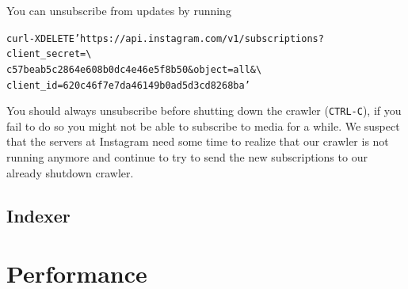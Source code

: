 \documentclass[11pt]{article}
\begin{document}
		You can unsubscribe from updates by running
		\begin{alltt}
			curl -X DELETE 'https://api.instagram.com/v1/subscriptions?client_secret=\textbackslash
			     c57beab5c2864e608b0dc4e46e5f8b50&object=all&\textbackslash
			     client_id=620c46f7e7da46149b0ad5d3cd8268ba'
		\end{alltt}

		You should always unsubscribe before shutting down the crawler (\texttt{CTRL-C}), if you fail to do so you might not be able to subscribe to media for a while. We suspect that the servers at Instagram need some time to realize that our crawler is not running anymore and continue to try to send the new subscriptions to our already shutdown crawler.
	\subsection{Indexer}
\section{Performance}
\end{document}
